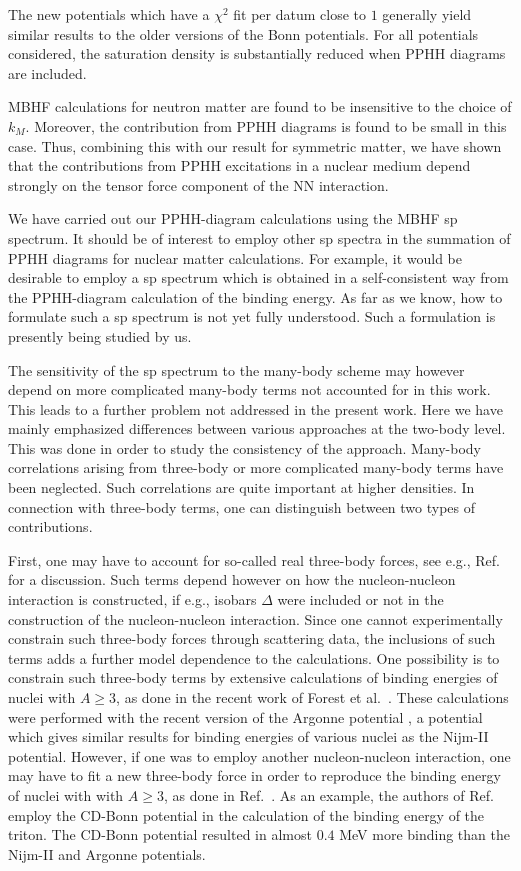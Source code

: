 The new potentials which have a $\chi^2$ fit per datum close 
to $1$ generally yield similar results to the older versions 
of the Bonn potentials. 
For all potentials considered, the saturation density
is substantially reduced when PPHH diagrams are included.

MBHF calculations for neutron matter are found to be insensitive
to the choice of $k_M$. Moreover, the contribution from PPHH 
diagrams is found to be small in this case. 
Thus, combining this  with 
our result for symmetric matter, we have shown that the contributions
from PPHH excitations in a nuclear medium depend strongly on the 
tensor force component of the NN interaction. 

We have carried out our PPHH-diagram calculations using the 
MBHF sp spectrum.
It should be of interest to employ other sp spectra in the summation 
of PPHH diagrams for 
nuclear matter calculations. For example, it would be desirable to 
employ a sp spectrum which is obtained in a 
self-consistent way from the
PPHH-diagram calculation of the binding energy. 
As far as we know, how to formulate
such a sp spectrum is not yet fully understood. 
Such a formulation is presently being studied by us.

The sensitivity of the sp spectrum to the many-body scheme
may however depend on more complicated 
many-body terms not accounted
for in this work.  
This leads to a further problem 
not addressed in the present
work. Here we have  mainly emphasized differences between 
various approaches at the two-body level. This was done 
in order to study the consistency of the approach. Many-body
correlations arising from three-body or more complicated
many-body terms have been neglected. 
Such correlations are quite important
at higher densities. 
In connection with three-body terms, one can distinguish
between two types of contributions. 

First, one may have to 
account for  so-called real three-body forces, see e.g., 
Ref.\ \cite{wff88} for a discussion. 
Such terms depend however on how
the nucleon-nucleon interaction is constructed, if e.g., isobars 
$\Delta$ were included or not in the construction of the
nucleon-nucleon interaction. 
Since one cannot experimentally constrain such three-body
forces through  scattering data, the inclusions of such terms
adds a further
model dependence to the calculations. 
One possibility is to constrain such three-body terms by extensive
calculations of binding energies of nuclei with $A \geq 3$, as done
in the recent work of Forest et al.\ \cite{forest96}. 
These calculations
were performed with the recent version of the Argonne potential
\cite{v18}, a potential which gives similar results for binding
energies of various nuclei as the Nijm-II potential. 
However, if one was to employ another nucleon-nucleon
interaction, 
one may have to fit a 
new three-body force in order to
reproduce the binding energy of nuclei with  with $A \geq 3$, as
done in Ref.\ \cite{forest96}. As an example, 
the authors of Ref.\ \cite{cdbonn} employ 
the CD-Bonn potential in the calculation 
of the binding energy of the triton. The CD-Bonn 
potential resulted 
in almost $0.4$ 
MeV more binding than the Nijm-II and Argonne \cite{v18}
potentials.   

